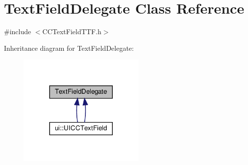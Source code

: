 \hypertarget{classTextFieldDelegate}{}\section{Text\+Field\+Delegate Class Reference}
\label{classTextFieldDelegate}


{\ttfamily \#include $<$C\+C\+Text\+Field\+T\+T\+F.\+h$>$}



Inheritance diagram for Text\+Field\+Delegate\+:
\nopagebreak
\begin{figure}[H]
\begin{center}
\leavevmode
\includegraphics[width=176pt]{classTextFieldDelegate__inherit__graph}
\end{center}
\end{figure}
